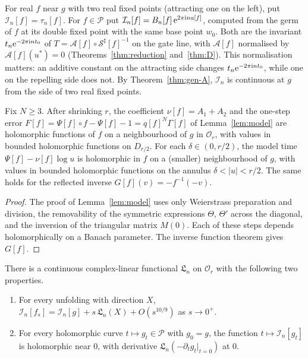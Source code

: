 For real $f$ near $g$ with two real fixed points (attracting one on the left),
put $\mathcal I_n[f]=\tau_n[f]$.  For $f\in\mathcal P$ put
$\mathcal I_n[f]=B_n[f]\,\mathrm{e}^{2\pi\mathrm{i} na[f]}$, computed from the germ of $f$ at its
double fixed point with the same base point $w_0$.  Both are the invariant
$t_n\mathrm{e}^{-2\pi\mathrm{i} nt_0}$ of $T=\mathcal A[f]\circ\mathcal S^\sharp[f]^{-1}$ on
the gate line, with $\mathcal A[f]$ normalised by $\mathcal A[f](u^*)=0$
(Theorems~\ref{thm:reduction} and~\ref{thm:D}).  This normalisation matters:
an additive constant on the attracting side changes $t_n\mathrm{e}^{-2\pi\mathrm{i} nt_0}$,
while one on the repelling side does not.  By
Theorem~\ref{thm:gen-A}, $\mathcal I_n$ is continuous at $g$ from the side of two
real fixed points.

\begin{lemma}\label{lem:gen-banach}
Fix $N\ge3$.  After shrinking $r$, the coefficient $\nu[f]=A_1+A_2$ and the
one-step error $F[f]=\Psi[f]\circ f-\Psi[f]-1=q[f]^N\Gamma[f]$ of
Lemma~\ref{lem:model} are holomorphic functions of $f$ on a neighbourhood of
$g$ in $\mathcal O_r$, with values in bounded holomorphic functions on
$D_{r/2}$.  For each $\delta\in(0,r/2)$, the model time $\Psi[f]-\nu[f]\log u$
is holomorphic in $f$ on a (smaller) neighbourhood of $g$, with values in
bounded holomorphic functions on the annulus $\delta<|u|<r/2$.  The same
holds for the reflected inverse $G[f](v)=-f^{-1}(-v)$.
\end{lemma}

\begin{proof}
The proof of Lemma~\ref{lem:model} uses only Weierstrass preparation and
division, the removability of the symmetric expressions $\Theta$, $\Theta'$
across the diagonal, and the inversion of the triangular matrix $M(0)$.  Each
of these steps depends holomorphically on a Banach parameter.  The inverse
function theorem gives $G[f]$.
\end{proof}

\begin{proposition}\label{prop:gen-linear}
There is a continuous complex-linear functional $\mathfrak L_n$ on $\mathcal O_r$ with
the following two properties.
\begin{enumerate}
\item For every unfolding with direction $X$,
  $\mathcal I_n[f_s]=\mathcal I_n[g]+s\,\mathfrak L_n(X)+O(s^{10/9})$ as
  $s\to0^+$.
\item For every holomorphic curve $t\mapsto g_t\in\mathcal P$ with $g_0=g$, the
  function $t\mapsto\mathcal I_n[g_t]$ is holomorphic near $0$, with derivative
  $\mathfrak L_n(-\partial_tg_t|_{t=0})$ at $0$.
\end{enumerate}
\end{proposition}

